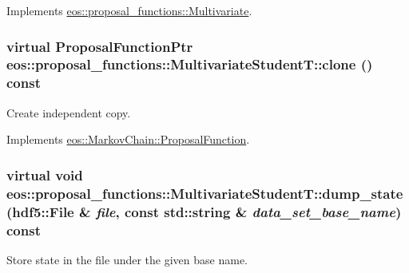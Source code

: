 Implements \hyperlink{classeos_1_1proposal__functions_1_1Multivariate_a284a17764a486687d3d1f2aee1a3bf3c}{eos::proposal\_\-functions::Multivariate}.\hypertarget{classeos_1_1proposal__functions_1_1MultivariateStudentT_a4f5007a73e656d9ff0476a4b5740018b}{
\subsubsection[{clone}]{\setlength{\rightskip}{0pt plus 5cm}virtual {\bf ProposalFunctionPtr} eos::proposal\_\-functions::MultivariateStudentT::clone () const}}
\label{classeos_1_1proposal__functions_1_1MultivariateStudentT_a4f5007a73e656d9ff0476a4b5740018b}


Create independent copy. 

Implements \hyperlink{structeos_1_1MarkovChain_1_1ProposalFunction_a7065079985f8bb44309d7773d85d225b}{eos::MarkovChain::ProposalFunction}.\hypertarget{classeos_1_1proposal__functions_1_1MultivariateStudentT_ab6afe975a0e1a553b785be0fd4daec05}{
\subsubsection[{dump\_\-state}]{\setlength{\rightskip}{0pt plus 5cm}virtual void eos::proposal\_\-functions::MultivariateStudentT::dump\_\-state ({\bf hdf5::File} \& {\em file}, \/  const std::string \& {\em data\_\-set\_\-base\_\-name}) const}}
\label{classeos_1_1proposal__functions_1_1MultivariateStudentT_ab6afe975a0e1a553b785be0fd4daec05}


Store state in the file under the given base name. 

